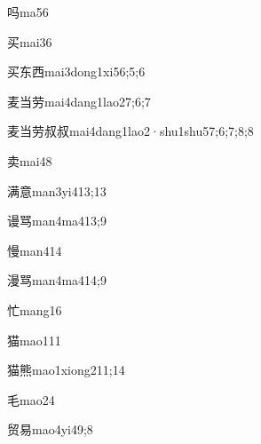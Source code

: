 \begin{verbete}{吗}{ma5}{6}
\end{verbete}
\begin{verbete}{买}{mai3}{6}
\end{verbete}
\begin{verbete}{买东西}{mai3dong1xi5}{6;5;6}
\end{verbete}
\begin{verbete}{麦当劳}{mai4dang1lao2}{7;6;7}
\end{verbete}
\begin{verbete}{麦当劳叔叔}{mai4dang1lao2·shu1shu5}{7;6;7;8;8}
\end{verbete}
\begin{verbete}{卖}{mai4}{8}
\end{verbete}
\begin{verbete}{满意}{man3yi4}{13;13}
\end{verbete}
\begin{verbete}{谩骂}{man4ma4}{13;9}
\end{verbete}
\begin{verbete}{慢}{man4}{14}
\end{verbete}
\begin{verbete}{漫骂}{man4ma4}{14;9}
\end{verbete}
\begin{verbete}{忙}{mang1}{6}
\end{verbete}
\begin{verbete}{猫}{mao1}{11}
\end{verbete}
\begin{verbete}{猫熊}{mao1xiong2}{11;14}
\end{verbete}
\begin{verbete}{毛}{mao2}{4}
\end{verbete}
\begin{verbete}{贸易}{mao4yi4}{9;8}
\end{verbete}
